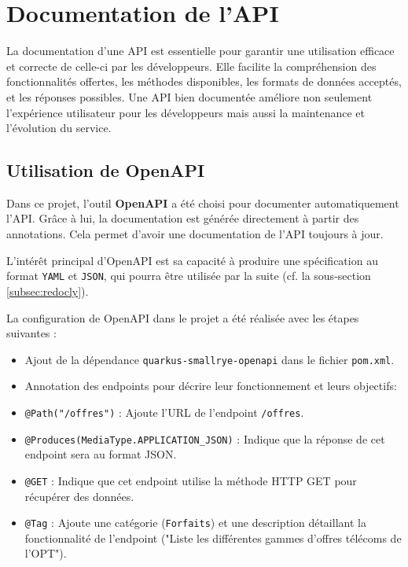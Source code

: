 \documentclass{article}
\begin{document}
	\section{Documentation de l'API}
	
	La documentation d'une API est essentielle pour garantir une utilisation efficace et correcte de celle-ci par les développeurs. Elle facilite la compréhension des fonctionnalités offertes, les méthodes disponibles, les formats de données acceptés, et les réponses possibles. Une API bien documentée améliore non seulement l'expérience utilisateur pour les développeurs mais aussi la maintenance et l'évolution du service.
	
	\subsection{Utilisation de OpenAPI}
	
	Dans ce projet, l'outil \textbf{OpenAPI} a été choisi pour documenter automatiquement l'API. Grâce à lui, la documentation est générée directement à partir des annotations. Cela permet d'avoir une documentation de l'API toujours à jour. 
	
	L'intérêt principal d'OpenAPI est sa capacité à produire une spécification au format \texttt{YAML} et \texttt{JSON}, qui pourra être utilisée par la suite (cf. la sous-section \ref{subsec:redocly}).
	
	La configuration de OpenAPI dans le projet a été réalisée avec les étapes suivantes :
	\begin{itemize}
		\item Ajout de la dépendance \texttt{quarkus-smallrye-openapi} dans le fichier \texttt{pom.xml}.
		\item Annotation des endpoints pour décrire leur fonctionnement et leurs objectifs:
	\end{itemize}
		
	\begin{itemize}
		\item \texttt{@Path("/offres")} : Ajoute l'URL de l'endpoint \texttt{/offres}.
		\item \texttt{@Produces(MediaType.APPLICATION\_JSON)} : Indique que la réponse de cet endpoint sera au format JSON.
		\item \texttt{@GET} : Indique que cet endpoint utilise la méthode HTTP GET pour récupérer des données.
		\item \texttt{@Tag} : Ajoute une catégorie (\texttt{Forfaits}) et une description détaillant la fonctionnalité de l'endpoint ("Liste les différentes gammes d'offres télécoms de l'OPT").
	\end{itemize}
\end{document}
